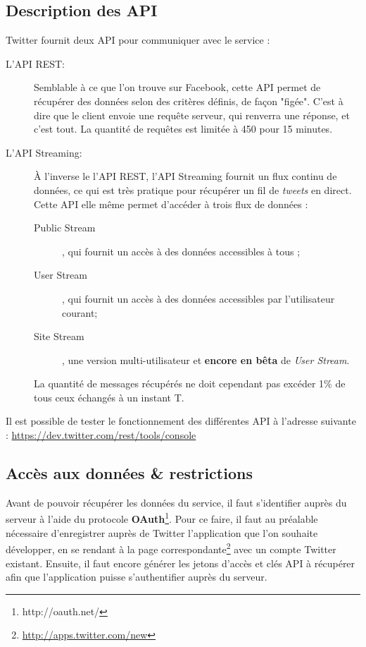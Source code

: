     \subsection{Description des API}
        Twitter fournit deux API pour communiquer avec le service :
        \begin{description}
            
            \item[L'API REST:] Semblable à ce que l'on trouve sur Facebook, cette API permet de récupérer des données selon des critères définis, de façon "figée". 
            C'est à dire que le client envoie une requête serveur, qui renverra une réponse, et c'est tout.
            La quantité de requêtes est limitée à 450 pour 15 minutes.
            
            \item[L'API Streaming:] À l'inverse le l'API REST, l'API Streaming fournit un flux continu de données, ce qui est très pratique pour récupérer un fil de \emph{tweets} en direct.
            Cette API elle même permet d'accéder à trois flux de données :
            
            \begin{description}
                \item[Public Stream], qui fournit un accès à des données accessibles à tous ;
                \item[User Stream], qui fournit un accès à des données accessibles par l'utilisateur courant;
                \item[Site Stream], une version multi-utilisateur et \textbf{encore en bêta} de \emph{User Stream}.
            \end{description}
            
            La quantité de messages récupérés ne doit cependant pas excéder 1\% de tous ceux échangés à un instant T.
            
        \end{description}
        
        Il est possible de tester le fonctionnement des différentes API à l'adresse suivante : \url{https://dev.twitter.com/rest/tools/console}
        
    \subsection{Accès aux données \& restrictions}
        Avant de pouvoir récupérer les données du service, il faut s'identifier auprès du serveur à l'aide du protocole \textbf{OAuth}\footnote{http://oauth.net/}.
        Pour ce faire, il faut au préalable nécessaire d'enregistrer auprès de Twitter l'application que l'on souhaite développer, en se rendant à la page correspondante\footnote{\url{http://apps.twitter.com/new}} avec un compte Twitter existant.
        Ensuite, il faut encore générer les jetons d'accès et clés API à récupérer afin que l'application puisse s'authentifier auprès du serveur.
        

